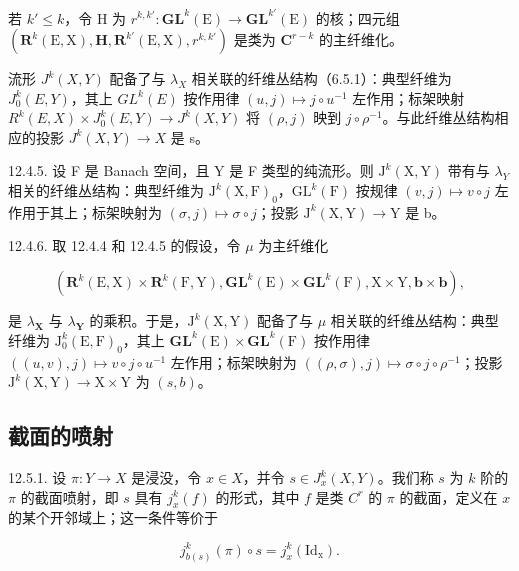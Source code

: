 若 \(k' \leqslant k\)，令 H 为 \(r^{k, k'} \colon \mathbf{GL}^{k}(\mathrm{E}) \to \mathbf{GL}^{k'}(\mathrm{E})\) 的核；四元组 \((\mathbf{R}^k(\mathrm{E}, \mathrm{X}), \mathbf{H}, \mathbf{R}^{k'}(\mathrm{E}, \mathrm{X}), r^{k, k'})\) 是类为 \(\mathbf{C}^{r-k}\) 的主纤维化。

流形 \(J^{k}(X,Y)\) 配备了与 \(\lambda_{X}\) 相关联的纤维丛结构（6.5.1）：典型纤维为 \(J_{0}^{k}(E,Y)\)，其上 \(GL^{k}(E)\) 按作用律 \((u,j)\mapsto j\circ u^{-1}\) 左作用；标架映射 \(R^{k}(E,X)\times J_{0}^{k}(E,Y)\to J^{k}(X,Y)\) 将 \((\rho,j)\) 映到 \(j\circ\rho^{-1}\)。与此纤维丛结构相应的投影 \(J^{k}(X,Y)\to X\) 是 s。

12.4.5. 设 F 是 Banach 空间，且 Y 是 F 类型的纯流形。则 \(\mathrm{J}^{k}(\mathrm{X},\mathrm{Y})\) 带有与 \(\lambda_{Y}\) 相关的纤维丛结构：典型纤维为 \(\mathrm{J}^{k}(\mathrm{X},\mathrm{F})_{0}\)，\(\mathrm{GL}^{k}(\mathrm{F})\) 按规律 \((v,j)\mapsto v\circ j\) 左作用于其上；标架映射为 \((\sigma,j)\mapsto\sigma\circ j\)；投影 \(\mathrm{J}^{k}(\mathrm{X},\mathrm{Y})\to\mathrm{Y}\) 是 b。

12.4.6. 取 12.4.4 和 12.4.5 的假设，令 \(\mu\) 为主纤维化

\[
(\mathbf {R} ^ {k} (\mathrm{E}, \mathrm{X}) \times \mathbf {R} ^ {k} (\mathrm{F}, \mathrm{Y}), \mathbf {G L} ^ {k} (\mathrm{E}) \times \mathbf {G L} ^ {k} (\mathrm{F}), \mathrm{X} \times \mathrm{Y}, \boldsymbol {b} \times \boldsymbol {b}),
\]

是 \(\lambda_{\mathbf{X}}\) 与 \(\lambda_{\mathbf{Y}}\) 的乘积。于是，\(\mathrm{J}^{k}(\mathrm{X},\mathrm{Y})\) 配备了与 \(\mu\) 相关联的纤维丛结构：典型纤维为 \(\mathrm{J}_{0}^{k}(\mathrm{E},\mathrm{F})_{0}\)，其上 \(\mathbf{GL}^{k}(\mathrm{E})\times \mathbf{GL}^{k}(\mathrm{F})\) 按作用律 \(((u,v),j)\mapsto v\circ j\circ u^{-1}\) 左作用；标架映射为 \(((\rho ,\sigma),j)\mapsto \sigma \circ j\circ \rho^{-1}\)；投影 \(\mathrm{J}^k (\mathrm{X},\mathrm{Y})\to \mathrm{X}\times \mathrm{Y}\) 为 \((s,b)\)。

\subsection{截面的喷射}

12.5.1. 设 \(\pi: Y \to X\) 是浸没，令 \(x \in X\)，并令 \(s \in J_x^k(X, Y)\)。我们称 \(s\) 为 \(k\) 阶的 \(\pi\) 的截面喷射，即 \(s\) 具有 \(j_x^k(f)\) 的形式，其中 \(f\) 是类 \(C^r\) 的 \(\pi\) 的截面，定义在 \(x\) 的某个开邻域上；这一条件等价于

\[
j _ {b (s)} ^ {k} (\pi) \circ s = j _ {x} ^ {k} (\mathrm{Id} _ {\mathrm{x}}).
\]

